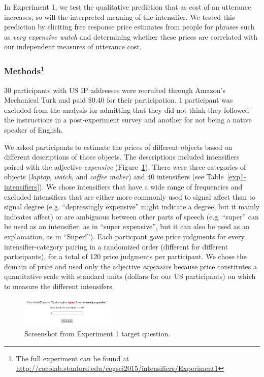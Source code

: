 \documentclass[10pt,letterpaper]{article}
\newcommand{\w}[1]{\emph{#1}}
\begin{document}
In Experiment 1, we test the qualitative prediction that as cost of an utterance increases, so will the interpreted meaning of the intensifier.
We tested this prediction
by eliciting free response price estimates from people for phrases such as \w{very expensive watch} and determining whether these prices are correlated with our independent measures of utterance cost.

\subsubsection{Methods\footnote{The full experiment can be found at \url{http://cocolab.stanford.edu/cogsci2015/intensifiers/Experiment1}}}

30 participants with US IP addresses were recruited through Amazon's Mechanical Turk and paid \$0.40 for their participation. 1 participant was excluded from the analysis for admitting that they did not think they followed the instructions in a post-experiment survey and another for not being a native speaker of English.

We asked participants to estimate the prices of different objects based on different descriptions of those objects. The descriptions included intensifiers paired with the adjective \w{expensive} (Figure~\ref{exp1-q}).
There were three categories of objects (\emph{laptop}, \emph{watch}, and \emph{coffee maker}) and 40 intensifiers (see Table~\ref{exp1-intensifiers}).
We chose intensifiers that have a wide range of frequencies and excluded intensifiers that are either more commonly used to signal affect than to signal degree (e.g. ``depressingly expensive'' might indicate a degree, but it mainly indicates affect) or are ambiguous between other parts of speech (e.g. ``super'' can be used as an intensifier, as in ``super expensive'', but it can also be used as an explamation, as in ``Super!'').
Each particpant gave price judgments for every intensifier-category pairing in a randomized order (different for different participants), for a total of 120 price judgments per participant.
We chose the domain of price and used only the adjective \w{expensive} because price constitutes a quantitative scale with standard units (dollars for our US participants) on which to measure the different intensifers.

\begin{figure}[ht]
\begin{center}
\includegraphics[width=0.4\textwidth]{exp1-q.png}
\end{center}
\caption{Screenshot from Experiment 1 target question.} 
\label{exp1-q}
\end{figure}
\end{document}
